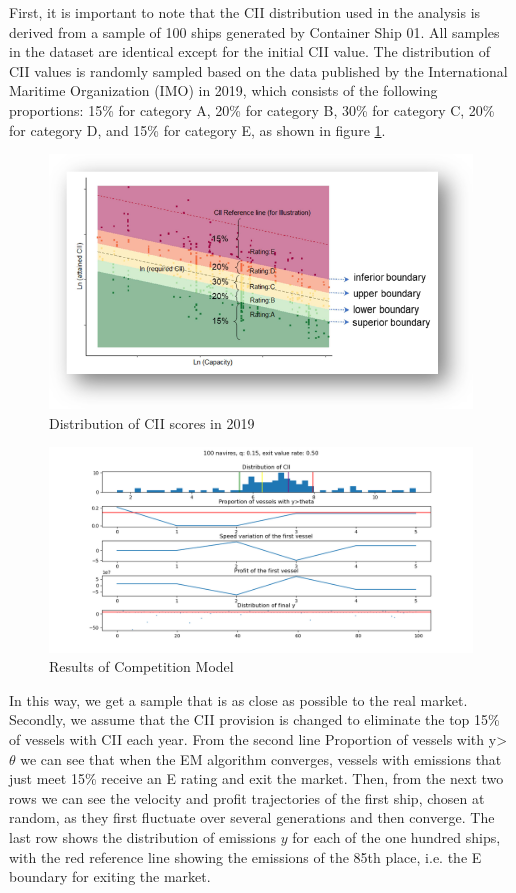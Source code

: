 \documentclass[a4paper,12pt]{article}
\begin{document}
First, it is important to note that the CII distribution used in the analysis is derived from a sample of 100 ships generated by Container Ship 01.
All samples in the dataset are identical except for the initial CII value.
The distribution of CII values is randomly sampled based on the data published by the International Maritime Organization (IMO) in 2019, which consists of the following proportions: 15\% for category A, 20\% for category B, 30\% for category C, 20\% for category D, and 15\% for category E, as shown in figure \ref{fig:cii_class}.

\begin{figure}[htbp]
	\centering
	\includegraphics[width=0.5\linewidth]{report-fig/cii_class.png}
	\caption{Distribution of CII scores in 2019}
	\label{fig:cii_class}
\end{figure}


\begin{figure}[H]
	\centering
	\includegraphics[width=0.99\linewidth]{report-fig/Meanfield.png}
	\caption{Results of Competition Model}
	\label{fig:meanfield}
\end{figure}

In this way, we get a sample that is as close as possible to the real market.
Secondly, we assume that the CII provision is changed to eliminate the top 15\% of vessels with CII each year.
From the second line Proportion of vessels with y>$\theta$ we can see that when the EM algorithm converges, vessels with emissions that just meet 15\% receive an E rating and exit the market.
Then, from the next two rows we can see the velocity and profit trajectories of the first ship, chosen at random, as they first fluctuate over several generations and then converge.
The last row shows the distribution of emissions $y$ for each of the one hundred ships, with the red reference line showing the emissions of the 85th place, i.e. the E boundary for exiting the market.\\
\end{document}

